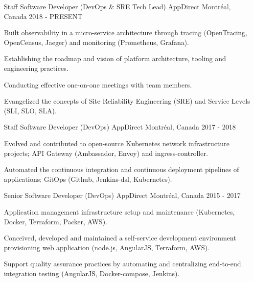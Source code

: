 
\begin{cventries}

  \cventry
    {Staff Software Developer (DevOps \& SRE Tech Lead)} %
    {AppDirect} %
    {Montréal, Canada} %
    {2018 - PRESENT} %
    {
      \begin{cvitems} %
        \item {Built observability in a micro-service architecture through tracing (OpenTracing, OpenCensus, Jaeger) and monitoring (Prometheus, Grafana).}
        \item {Establishing the roadmap and vision of platform architecture, tooling and engineering practices.}
        \item {Conducting effective one-on-one meetings with team members.}
        \item {Evangelized the concepts of Site Reliability Engineering (SRE) and Service Levels (SLI, SLO, SLA).}
      \end{cvitems}
    }

  \cventry
    {Staff Software Developer (DevOps)} %
    {AppDirect} %
    {Montréal, Canada} %
    {2017 - 2018} %
    {
      \begin{cvitems} %
        \item {Evolved and contributed to open-source Kubernetes network infrastructure projects; API Gateway (Ambassador, Envoy) and ingress-controller.}
        \item {Automated the continuous integration and continuous deployment pipelines of applications; GitOps (Github, Jenkins-dsl, Kubernetes).}
      \end{cvitems}
    }

  \cventry
    {Senior Software Developer (DevOps)} %
    {AppDirect} %
    {Montréal, Canada} %
    {2015 - 2017} %
    {
      \begin{cvitems} %
        \item {Application management infrastructure setup and maintenance (Kubernetes, Docker, Terraform, Packer, AWS).}
        \item {Conceived, developed and maintained a self-service development environment provisioning web application (node.js, AngularJS, Terraform, AWS).}
        \item {Support quality assurance practices by automating and centralizing end-to-end integration testing (AngularJS, Docker-compose, Jenkins).}
      \end{cvitems}
    }


\end{cventries}
